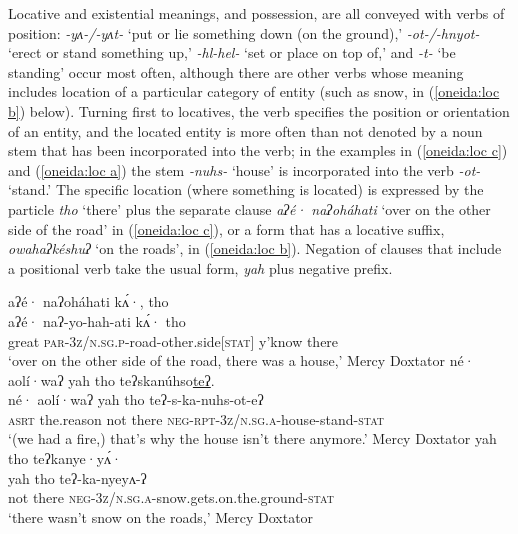 \documentclass[output=paper,colorlinks,citecolor=brown]{langscibook}
\begin{document}
Locative and existential meanings, and possession, are all conveyed with verbs of position: \textit{-yʌ-/-yʌt-} `put or lie something down (on the ground),' \textit{-ot-/-hnyot-} `erect or stand something up,' \textit{-hl-\-hel-} `set or place on top of,'  and \textit{-t-} `be standing' occur most often, although there are other verbs whose meaning includes location of a particular category of entity (such as snow, in (\ref{oneida:loc b}) below). Turning first to locatives, the verb specifies the position or orientation of an entity, and the located entity is more often than not denoted by a noun stem that has been incorporated into the verb; in the examples in (\ref{oneida:loc c}) and (\ref{oneida:loc a}) the stem \textit{-nuhs-} `house' is incorporated into the verb \textit{-ot-} `stand.' The specific location (where something is located) is expressed by the particle \textit{tho} `there' plus the separate clause \textit{aʔé· naʔoháhati} `over on the other side of the road' in (\ref{oneida:loc c}), or a form that has a locative suffix, \textit{owahaʔkéshuʔ} `on the roads', in (\ref{oneida:loc b}). Negation of clauses that include a positional verb take the usual form, \textit{yah} plus negative prefix.

\ea\label{oneida:loc}
    \ea\label{oneida:loc c}
        \glll aʔé· naʔoháhati kʌ́·, tho \\
        aʔé· naʔ-yo-hah-ati  kʌ́· tho	\\
        great \textsc{par-3z/n.sg.p}-road-other.side[\textsc{stat}] {y'know} there  \\
        \glt `over on the other side of the road, there was a house,' Mercy Doxtator \citep[142--143 (5)]{MichelsonEtAl2016}
    \ex\label{oneida:loc a}
        \glll né· aolí·waʔ yah tho teʔskanúhso\uline{teʔ}. \\
                né· aolí·waʔ yah	 tho	 teʔ-s-ka-nuhs-ot-eʔ \\
                \textsc{asrt} {the.reason} not there \textsc{neg-rpt-3z/n.sg.a}-house-stand-\textsc{stat} \\
        \glt `(we had a fire,) that's why the house isn't there anymore.' Mercy Doxtator \citep[142 (4)]{MichelsonEtAl2016} 
    \ex\label{oneida:loc b}
        {\glll yah tho teʔkanye·yʌ́· \\
        yah tho teʔ-ka-nyeyʌ-ʔ  \\
        not there \textsc{neg-3z/n.sg.a}-snow.gets.on.the.ground-\textsc{stat}  \\}
        \glt `there wasn't snow on the roads,' Mercy Doxtator \citep[193 (13)]{MichelsonEtAl2016}
    \z
\z
\end{document}
